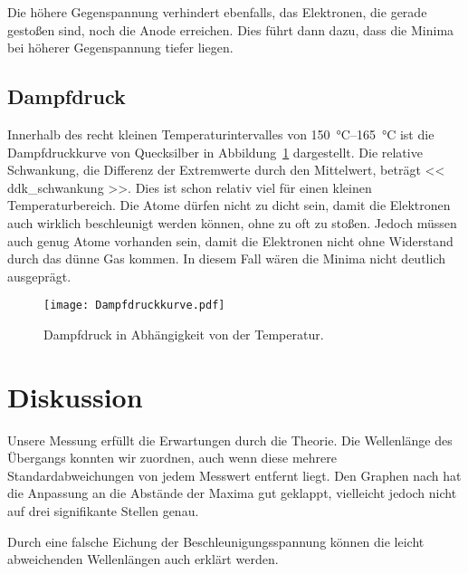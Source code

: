 Die höhere Gegenspannung verhindert ebenfalls, das Elektronen, die gerade
gestoßen sind, noch die Anode erreichen. Dies führt dann dazu, dass die Minima
bei höherer Gegenspannung tiefer liegen.

\subsection{Dampfdruck}

Innerhalb des recht kleinen Temperaturintervalles von
\SIrange{150}{165}{\celsius} ist die Dampfdruckkurve von Quecksilber in
Abbildung~\ref{fig:Dampfdruckkurve} dargestellt. Die relative Schwankung, die
Differenz der Extremwerte durch den Mittelwert, beträgt \num{<< ddk_schwankung
>>}. Dies ist schon relativ viel für einen kleinen Temperaturbereich. Die Atome
dürfen nicht zu dicht sein, damit die Elektronen auch wirklich beschleunigt
werden können, ohne zu oft zu stoßen. Jedoch müssen auch genug Atome vorhanden
sein, damit die Elektronen nicht ohne Widerstand durch das dünne Gas kommen. In
diesem Fall wären die Minima nicht deutlich ausgeprägt.

\begin{figure}[htbp]
    \centering
    \texttt{[image: Dampfdruckkurve.pdf]}
    \caption{%
        Dampfdruck in Abhängigkeit von der Temperatur.
    }
    \label{fig:Dampfdruckkurve}
\end{figure}

\section{Diskussion}

Unsere Messung erfüllt die Erwartungen durch die Theorie. Die Wellenlänge des
Übergangs konnten wir zuordnen, auch wenn diese mehrere Standardabweichungen
von jedem Messwert entfernt liegt. Den Graphen nach hat die Anpassung an die
Abstände der Maxima gut geklappt, vielleicht jedoch nicht auf drei signifikante
Stellen genau.

Durch eine falsche Eichung der Beschleunigungsspannung können die leicht
abweichenden Wellenlängen auch erklärt werden.

\printbibliography



